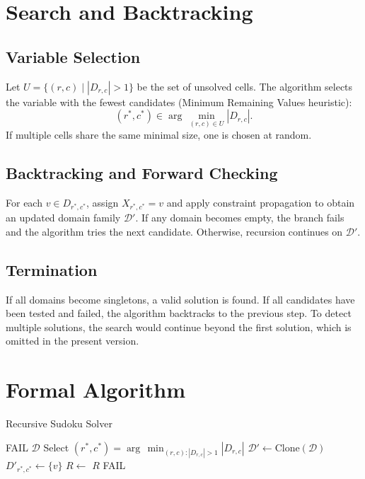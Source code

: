 \documentclass[a4paper,11pt]{article}
\newcommand{\argmin}{\operatorname{arg}\,\min}
\begin{document}
\section{Search and Backtracking}

\subsection{Variable Selection}
Let \(U = \{(r,c) \mid |D_{r,c}| > 1\}\) be the set of unsolved cells.
The algorithm selects the variable with the fewest candidates (Minimum Remaining Values heuristic):
\[
(r^{*}, c^{*}) \in \argmin_{(r,c)\in U} |D_{r,c}|.
\]
If multiple cells share the same minimal size, one is chosen at random.

\subsection{Backtracking and Forward Checking}
For each \(v \in D_{r^{*},c^{*}}\), assign \(X_{r^{*},c^{*}}=v\) and apply constraint propagation to obtain an updated domain family \(\mathcal{D}'\).
If any domain becomes empty, the branch fails and the algorithm tries the next candidate.
Otherwise, recursion continues on \(\mathcal{D}'\).

\subsection{Termination}
If all domains become singletons, a valid solution is found.
If all candidates have been tested and failed, the algorithm backtracks to the previous step.
To detect multiple solutions, the search would continue beyond the first solution, which is omitted in the present version.

\section{Formal Algorithm}

\begin{algorithm}[h!]
\caption{Recursive Sudoku Solver}
\begin{algorithmic}[1]
    \State {}  
     \State \Return FAIL \EndIf
     \State \Return $\mathcal{D}$  \EndIf
    \State Select $(r^{*}, c^{*}) = \argmin_{(r,c): |D_{r,c}|>1} |D_{r,c}|$
        \State $\mathcal{D}' \gets \text{Clone}(\mathcal{D})$
        \State $D'_{r^{*},c^{*}} \gets \{v\}$
        \State $R \gets$ 
         \State \Return $R$ \EndIf
    \EndFor
    \State \Return FAIL
\EndFunction
\end{algorithmic}
\end{algorithm}
\end{document}
